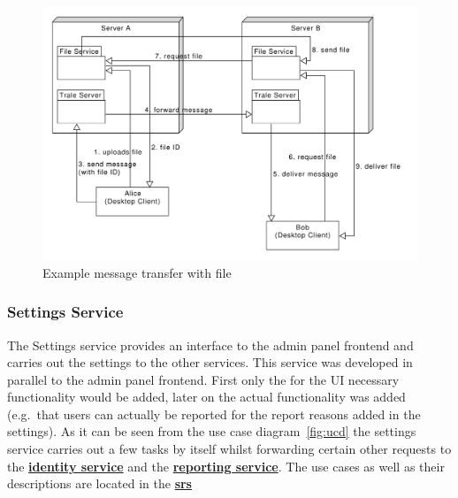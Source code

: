 \begin{figure}[H]
    \centering
    \includegraphics[width=1.0\textwidth]{./graphics/fileService}
    \caption{Example message transfer with file}
    \label{fig:figure43}
\end{figure}

\pagebreak

\subsubsection{Settings Service}\label{subsubsec:settingsSer}

The Settings service provides an interface to the admin panel frontend and carries out the settings to the other
services.
This service was developed in parallel to the admin panel frontend.
First only the for the UI necessary functionality would be added, later on the actual functionality was added
(e.g.\ that users can actually be reported for the report reasons added in the settings).
As it can be seen from the use case diagram~\ref{fig:ucd} the settings service carries out a few tasks by itself whilst
forwarding certain other requests to the \hyperref[subsubsec:identitySer]{\textbf{identity service}} and the
\hyperref[subsubsec:reportingSer]{\textbf{reporting service}}.
The use cases as well as their descriptions are located in the
\hyperref[ch:software-requirements-specification-(srs)]{\textbf{\ac{srs}}}

